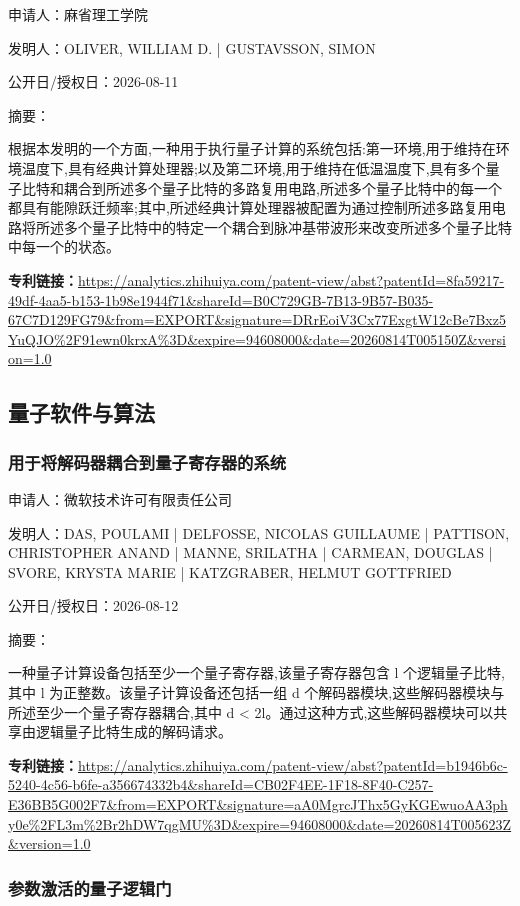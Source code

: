 \documentclass[12pt,a4paper]{ctexart}
\begin{document}
申请人：麻省理工学院

发明人：OLIVER, WILLIAM D. | GUSTAVSSON, SIMON

公开日/授权日：2026-08-11

摘要：

根据本发明的一个方面,一种用于执行量子计算的系统包括:第一环境,用于维持在环境温度下,具有经典计算处理器;以及第二环境,用于维持在低温温度下,具有多个量子比特和耦合到所述多个量子比特的多路复用电路,所述多个量子比特中的每一个都具有能隙跃迁频率;其中,所述经典计算处理器被配置为通过控制所述多路复用电路将所述多个量子比特中的特定一个耦合到脉冲基带波形来改变所述多个量子比特中每一个的状态。

\noindent\textbf{专利链接：}\url{https://analytics.zhihuiya.com/patent-view/abst?patentId=8fa59217-49df-4aa5-b153-1b98e1944f71&shareId=B0C729GB-7B13-9B57-B035-67C7D129FG79&from=EXPORT&signature=DRrEoiV3Cx77ExgtW12cBe7Bxz5YuQJO%2F91ewn0krxA%3D&expire=94608000&date=20260814T005150Z&version=1.0}


\subsection{ 量子软件与算法 }

\subsubsection{ 用于将解码器耦合到量子寄存器的系统 }

申请人：微软技术许可有限责任公司

发明人：DAS, POULAMI | DELFOSSE, NICOLAS GUILLAUME | PATTISON, CHRISTOPHER ANAND | MANNE, SRILATHA | CARMEAN, DOUGLAS | SVORE, KRYSTA MARIE | KATZGRABER, HELMUT GOTTFRIED

公开日/授权日：2026-08-12

摘要：

一种量子计算设备包括至少一个量子寄存器,该量子寄存器包含 l 个逻辑量子比特,其中 l 为正整数。该量子计算设备还包括一组 d 个解码器模块,这些解码器模块与所述至少一个量子寄存器耦合,其中 d < 2l。通过这种方式,这些解码器模块可以共享由逻辑量子比特生成的解码请求。

\noindent\textbf{专利链接：}\url{https://analytics.zhihuiya.com/patent-view/abst?patentId=b1946b6c-5240-4c56-b6fe-a356674332b4&shareId=CB02F4EE-1F18-8F40-C257-E36BB5G002F7&from=EXPORT&signature=aA0MgrcJThx5GyKGEwuoAA3phy0e%2FL3m%2Br2hDW7qgMU%3D&expire=94608000&date=20260814T005623Z&version=1.0}

\subsubsection{ 参数激活的量子逻辑门 }
\end{document}
